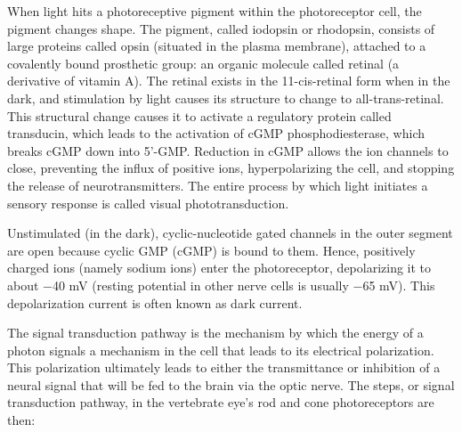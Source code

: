 When light hits a photoreceptive pigment within the photoreceptor cell, the pigment changes shape. The pigment, called iodopsin or rhodopsin, consists of large proteins called opsin (situated in the plasma membrane), attached to a covalently bound prosthetic group: an organic molecule called retinal (a derivative of vitamin A). The retinal exists in the 11-cis-retinal form when in the dark, and stimulation by light causes its structure to change to all-trans-retinal. This structural change causes it to activate a regulatory protein called transducin, which leads to the activation of cGMP phosphodiesterase, which breaks cGMP down into 5'-GMP. Reduction in cGMP allows the ion channels to close, preventing the influx of positive ions, hyperpolarizing the cell, and stopping the release of neurotransmitters. The entire process by which light initiates a sensory response is called visual phototransduction.

Unstimulated (in the dark), cyclic-nucleotide gated channels in the outer segment are open because cyclic GMP (cGMP) is bound to them. Hence, positively charged ions (namely sodium ions) enter the photoreceptor, depolarizing it to about −40 mV (resting potential in other nerve cells is usually −65 mV). This depolarization current is often known as dark current.

The signal transduction pathway is the mechanism by which the energy of a photon signals a mechanism in the cell that leads to its electrical polarization. This polarization ultimately leads to either the transmittance or inhibition of a neural signal that will be fed to the brain via the optic nerve. The steps, or signal transduction pathway, in the vertebrate eye's rod and cone photoreceptors are then:

